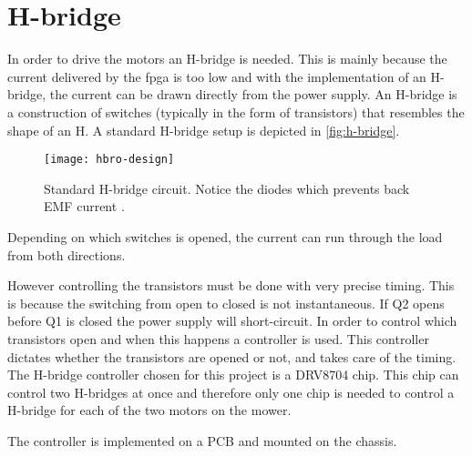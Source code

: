 \section{H-bridge}\label{sec:hbro}
In order to drive the motors an H-bridge is needed. This is mainly because the current delivered by the \gls{fpga} is too low and with the implementation of an H-bridge, the current can be drawn directly from the power supply. An H-bridge is a construction of switches (typically in the form of transistors) that resembles the shape of an H. A standard H-bridge setup is depicted in \autoref{fig:h-bridge}. 

\begin{figure}[htb]
\centering
\texttt{[image: hbro-design]}
\caption{Standard H-bridge circuit. Notice the diodes which prevents back EMF current \citep{hbridge}.}
\label{fig:h-bridge}
\end{figure}

Depending on which switches is opened, the current can run through the load from both directions. 


However controlling the transistors must be done with very precise timing. This is because the switching from open to closed is not instantaneous. If Q2 opens before Q1 is closed the power supply will short-circuit. In order to control which transistors open and when this happens a controller is used. This controller dictates whether the transistors are opened or not, and takes care of the timing. The H-bridge controller chosen for this project is a DRV8704 chip. This chip can control two H-bridges at once and therefore only one chip is needed to control a H-bridge for each of the two motors on the mower. 

The controller is implemented on a PCB and mounted on the chassis.

